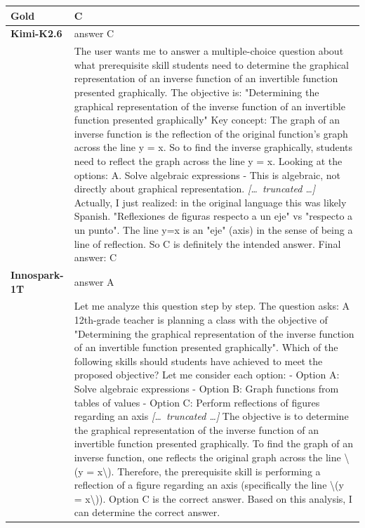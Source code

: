 \begin{longtable}{@{}l p{12.5cm}@{}}
  \textbf{Gold} & C \\
  \midrule
  \textbf{Kimi-K2.6} & answer C \\
  & The user wants me to answer a multiple-choice question about what prerequisite skill students need to determine the graphical representation of an inverse function of an invertible function presented graphically. \newline The objective is: "Determining the graphical representation of the inverse function of an invertible function presented graphically" \newline Key concept: The graph of an inverse function is the reflection of the original function's graph across the line y = x. \newline So to find the inverse graphically, students need to reflect the graph across the line y = x. \newline Looking at the options: \newline A. Solve algebraic expressions - This is algebraic, not directly about graphical representation. \newline \textit{[\ldots\ truncated \ldots]} \newline Actually, I just realized: in the original language this was likely Spanish. "Reflexiones de figuras respecto a un eje" vs "respecto a un punto". The line y=x is an "eje" (axis) in the sense of being a line of reflection. So C is definitely the intended answer. \newline Final answer: C \\
  \textbf{Innospark-1T} & answer A \\
  & Let me analyze this question step by step. \newline The question asks: A 12th-grade teacher is planning a class with the objective of "Determining the graphical representation of the inverse function of an invertible function presented graphically". Which of the following skills should students have achieved to meet the proposed objective? \newline Let me consider each option: \newline - Option A: Solve algebraic expressions \newline - Option B: Graph functions from tables of values \newline - Option C: Perform reflections of figures regarding an axis \newline \textit{[\ldots\ truncated \ldots]} \newline The objective is to determine the graphical representation of the inverse function of an invertible function presented graphically. To find the graph of an inverse function, one reflects the original graph across the line \textbackslash{}(y = x\textbackslash{}). Therefore, the prerequisite skill is performing a reflection of a figure regarding an axis (specifically the line \textbackslash{}(y = x\textbackslash{})). Option C is the correct answer. \newline Based on this analysis, I can determine the correct answer. \\

\end{longtable}
